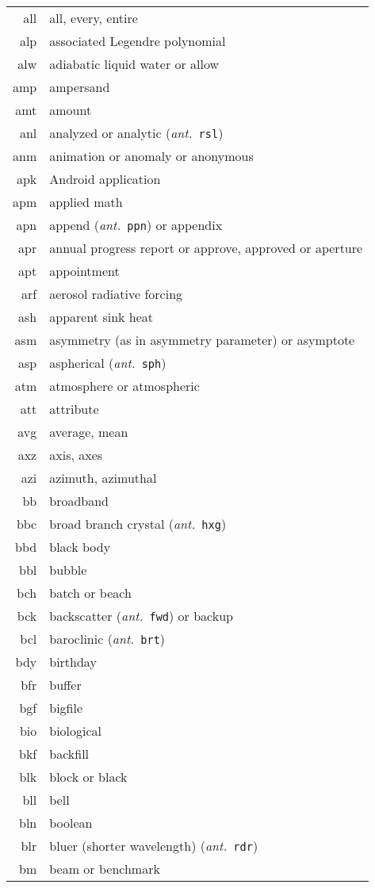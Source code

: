 \documentclass[12pt,twoside]{article}
\newcommand{\ant}[1]{(\textit{ant.}~\texttt{#1})}
\begin{document}
\begin{longtable}[>{\bfseries}l]{>{\ttfamily}r l}
all & all, every, entire \\
alp & associated Legendre polynomial \\
alw & adiabatic liquid water or allow \\
amp & ampersand \\
amt & amount \\
anl & analyzed or analytic \ant{rsl} \\
anm & animation or anomaly or anonymous \\
apk & Android application \\
apm & applied math \\
apn & append \ant{ppn} or appendix \\
apr & annual progress report or approve, approved or aperture \\
apt & appointment \\
arf & aerosol radiative forcing \\
ash & apparent sink heat \\
asm & asymmetry (as in asymmetry parameter) or asymptote \\
asp & aspherical \ant{sph} \\
atm & atmosphere or atmospheric \\
att & attribute \\
avg & average, mean \\
axz & axis, axes \\
azi & azimuth, azimuthal \\
bb & broadband \\
bbc & broad branch crystal \ant{hxg} \\
bbd & black body \\
bbl & bubble \\
bch & batch or beach \\
bck & backscatter \ant{fwd} or backup \\
bcl & baroclinic \ant{brt} \\
bdy & birthday \\
bfr & buffer \\
bgf & bigfile \\
bio & biological \\
bkf & backfill \\
blk & block or black \\
bll & bell \\
bln & boolean \\
blr & bluer (shorter wavelength) \ant{rdr} \\
bm & beam or benchmark \\

\end{longtable}
\end{document}
